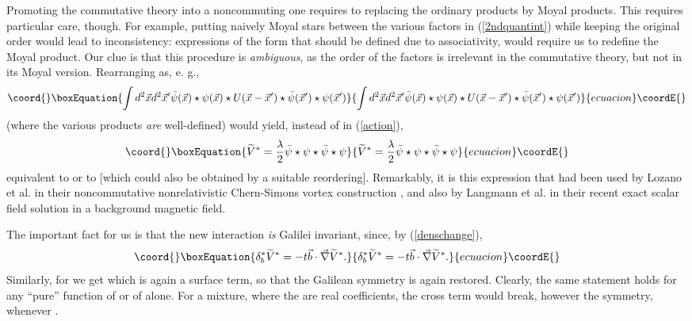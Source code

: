 \documentclass[a4paper,11pt]{article}
\def\vb{{\vec b}}
\def\vx{{\vec x}}
\def\vnabla{{\vec\nabla}}
\begin{document}
Promoting the commutative theory into a noncommuting one
requires to replacing the ordinary products by Moyal products.
This requires particular care, though. For example, putting
naively Moyal stars between the various factors in
(\ref{2ndquantint}) while keeping the original order
would lead to inconsistency: expressions of the
form \myHighlight{$\psi(\vx)\star\psi(\vx')$}\coordHE{} that should be defined
due to associativity, would require us to
redefine the Moyal product.
Our clue is that this procedure is {\it ambiguous},
as the order of the factors is irrelevant in the
commutative theory, but not in its Moyal version.
  Rearranging as, e. g.,
\begin{equation}\coord{}\boxEquation{
     \int
     d^2\vx d^2\vx'
     \bar{\psi}(\vx)\star\psi(\vx)
     \star U(\vx-\vx')\star\bar{\psi}(\vx')\star\psi(\vx')
     \label{rearrangedpot}
}{
     \int
     d^2\vx d^2\vx'
     \bar{\psi}(\vx)\star\psi(\vx)
     \star U(\vx-\vx')\star\bar{\psi}(\vx')\star\psi(\vx')
     }{ecuacion}\coordE{}\end{equation}
(where the various products {\it are} well-defined)
would yield, instead of \coordHE{} in (\ref{action}),
\begin{equation}\coord{}\boxEquation{
     \widetilde{V}^*=\frac{\lambda}{2}
     \bar{\psi}\star\psi\star\bar{\psi}\star\psi
     \label{ourpot}
}{
     \widetilde{V}^*=\frac{\lambda}{2}
     \bar{\psi}\star\psi\star\bar{\psi}\star\psi
     }{ecuacion}\coordE{}\end{equation}
equivalent to \coordHE{} or to
\coordHE{}
[which could also be obtained by a suitable reordering].
Remarkably, it is this expression that had been used by
Lozano et al. in their noncommutative nonrelativistic
Chern-Simons vortex construction \cite{Schap},
and also by Langmann et al. \cite{Langmann}
in their recent exact scalar field solution in a
background magnetic field.

The important fact for us is that the new interaction
{\it is} Galilei invariant, since, by
(\ref{denschange}),
\begin{equation}\coord{}\boxEquation{
     \delta^*_{b}\widetilde{V}^*=-t\vb\cdot\vnabla\widetilde{V}^*.
}{
     \delta^*_{b}\widetilde{V}^*=-t\vb\cdot\vnabla\widetilde{V}^*.
}{ecuacion}\coordE{}\end{equation}
Similarly, for \coordHE{} we get
\myHighlight{$\delta^*_{b}\widetilde{\widetilde{V}}^*=-t\vb\cdot\vnabla
\widetilde{\widetilde{V}}
-\theta\vb\times\vnabla\widetilde{\widetilde{V}}^*$}\coordHE{}
which is again a surface term, so that the Galilean symmetry is
again restored.
Clearly, the same statement holds for any ``pure'' function
of \coordHE{} or of \coordHE{} alone.  For a mixture,
\coordHE{}
where the \coordHE{} are real coefficients, the cross
term would break, however the symmetry,
whenever \coordHE{}.
\end{document}
